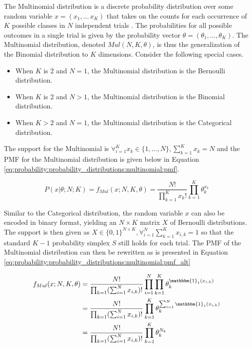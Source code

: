 The Multinomial distribution is a discrete probability distribution over some random variable $x = (x_{1}, \dots\, x_{K})$ that takes on the counts for each occurrence of $K$ possible classes in $N$ independent trials \cite{ref:wackerly:2014}. The probabilities for all possible outcomes in a single trial is given by the probability vector $\theta = (\theta_{1}, \dots, \theta_{K})$. The Multinomial distribution, denoted $Mul(N, K, \theta)$, is thus the generalization of the Binomial distribution to $K$ dimensions. Consider the following special cases.

\begin{itemize}
	\item When $K$ is 2 and $N = 1$, the Multinomial distribution is the Bernoulli distribution.
	\item When $K$ is 2 and $N > 1$, the Multinomial distribution is the Binomial distribution.
	\item When $K > 2$ and $N = 1$, the Multinomial distribution is the Categorical distribution.
\end{itemize}
  
The support for the Multinomial is $\forall_{i=1}^{K} x_{k} \in \{1, \dots, N\}, \sum_{k=1}^{K}x_{k} = N$ and the \ac{PMF} for the Multinomial distribution is given below in Equation \ref{eq:probability:probability_distributions:multinomial:pmf}.

\begin{equation}
    \label{eq:probability:probability_distributions:multinomial:pmf}
    P(x \vert \theta; N; K) = f_{Mul}(x; N, K, \theta) = \frac{N!}{\prod_{k=1}^{K}x_{k}!} \prod_{k=1}^{K}\theta_{k}^{x_{k}}
\end{equation}

Similar to the Categorical distribution, the random variable $x$ can also be encoded in binary format, yielding an $N \times K$ matrix $X$ of Bernoulli distributions. The support is then given as $X \in \{0, 1\}^{N \times K}, \forall_{i=1}^{N}\sum_{k=1}^{K} x_{i,k} = 1$ so that the standard $K-1$ probability simplex $S$ still holds for each trial. The \ac{PMF} of the Multinomial distribution can then be rewritten as is presented in Equation \ref{eq:probability:probability_distributions:multinomial:pmf_alt}

\begin{equation}
    \label{eq:probability:probability_distributions:multinomial:pmf_alt}
    \begin{split}
    f_{Mul}(x; N, K, \theta) &= \frac{N!}{\prod_{k=1}(\sum_{i=1}^{N}x_{i, k})!}\prod_{i=1}^{N}\prod_{k=1}^{K}\theta_{k}^{\mathbbm{1}_{1}(x_{i,k})} \\
    	&= \frac{N!}{\prod_{k=1}(\sum_{i=1}^{N}x_{i, k})!} \prod_{k=1}^{K}\theta_{k}^{\sum_{i=1}^{N}\mathbbm{1}_{1}(x_{i,k})} \\
    	&= \frac{N!}{\prod_{k=1}(\sum_{i=1}^{N}x_{i, k})!} \prod_{k=1}^{K}\theta_{k}^{N_{k}} \\
    \end{split}
\end{equation}

